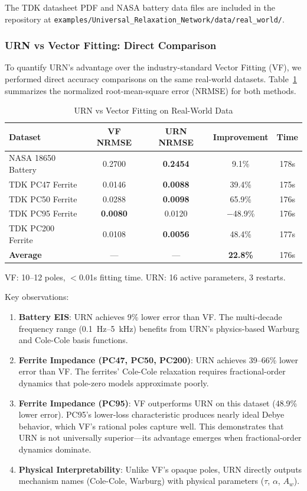 \documentclass{ieeeaccess}
\begin{document}
The TDK datasheet PDF and NASA battery data files are included in the repository at \texttt{examples/Universal\_Relaxation\_Network/data/real\_world/}.

\subsubsection{URN vs Vector Fitting: Direct Comparison}
\label{sec:urn_vs_vf}

To quantify URN's advantage over the industry-standard Vector Fitting (VF), we performed direct accuracy comparisons on the same real-world datasets. Table~\ref{tab:urn_vs_vf} summarizes the normalized root-mean-square error (NRMSE) for both methods.

\begin{table}[!t]
\caption{URN vs Vector Fitting on Real-World Data}
\label{tab:urn_vs_vf}
\centering
\begin{tabular}{@{}lcccc@{}}
\toprule
\textbf{Dataset} & \textbf{VF NRMSE} & \textbf{URN NRMSE} & \textbf{Improvement} & \textbf{Time} \\
\midrule
NASA 18650 Battery & 0.2700 & \textbf{0.2454} & 9.1\% & 178s \\
TDK PC47 Ferrite & 0.0146 & \textbf{0.0088} & 39.4\% & 175s \\
TDK PC50 Ferrite & 0.0288 & \textbf{0.0098} & 65.9\% & 176s \\
TDK PC95 Ferrite & \textbf{0.0080} & 0.0120 & $-$48.9\% & 176s \\
TDK PC200 Ferrite & 0.0108 & \textbf{0.0056} & 48.4\% & 177s \\
\midrule
\textbf{Average} & --- & --- & \textbf{22.8\%} & 176s \\
\bottomrule
\end{tabular}
\begin{flushleft}
\footnotesize{VF: 10--12 poles, $<$0.01s fitting time. URN: 16 active parameters, 3 restarts.}
\end{flushleft}
\end{table}

Key observations:
\begin{enumerate}
\item \textbf{Battery EIS}: URN achieves 9\% lower error than VF. The multi-decade frequency range (0.1~Hz--5~kHz) benefits from URN's physics-based Warburg and Cole-Cole basis functions.
\item \textbf{Ferrite Impedance (PC47, PC50, PC200)}: URN achieves 39--66\% lower error than VF. The ferrites' Cole-Cole relaxation requires fractional-order dynamics that pole-zero models approximate poorly.
\item \textbf{Ferrite Impedance (PC95)}: VF outperforms URN on this dataset (48.9\% lower error). PC95's lower-loss characteristic produces nearly ideal Debye behavior, which VF's rational poles capture well. This demonstrates that URN is not universally superior---its advantage emerges when fractional-order dynamics dominate.
\item \textbf{Physical Interpretability}: Unlike VF's opaque poles, URN directly outputs mechanism names (Cole-Cole, Warburg) with physical parameters ($\tau$, $\alpha$, $A_w$).
\end{enumerate}
\end{document}

